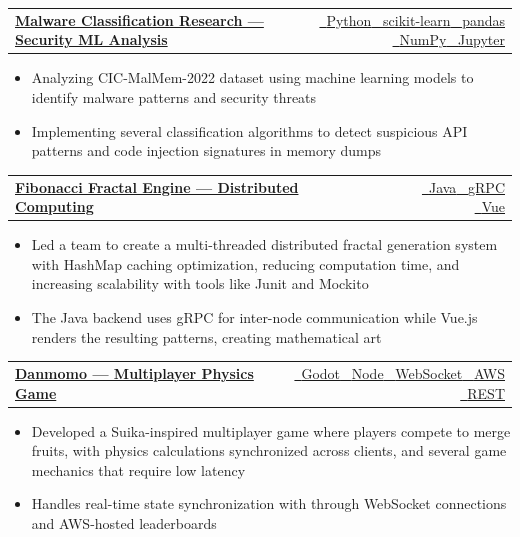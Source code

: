 \documentclass[letterpaper,10pt]{article}
\makeatletter
\newenvironment{ProjectNotes}{%
  \begingroup\fontsize{9.5}{11}\selectfont
  \begin{itemize}[label=--,leftmargin=0.2in,topsep=2pt,itemsep=2pt,parsep=0pt,partopsep=0pt]
}{%
  \end{itemize}\endgroup\vspace{4pt}
}
\newcommand{\TechTag}[1]{{\footnotesize #1}}
\newcommand{\IconTag}[2]{#1\ \TechTag{#2}}
\providecommand{\icJava}{\faIcon{coffee}}
\providecommand{\icPy}{\faIcon{python}}
\providecommand{\icVue}{\faIcon{vuejs}}
\providecommand{\icGodot}{\faIcon{gamepad}}
\providecommand{\icNode}{\faIcon{node-js}}
\providecommand{\icWS}{\faIcon{plug}}
\providecommand{\icGRPC}{\faIcon{exchange-alt}}
\providecommand{\icREST}{\faIcon{cloud}}
\providecommand{\icPandas}{\faIcon{table}}
\providecommand{\icNumpy}{\faIcon{calculator}}
\providecommand{\icSklearn}{\faIcon{brain}}
\providecommand{\icJupyter}{\faIcon{book}}
\providecommand{\icAWS}{\faIcon{aws}}
\newcommand{\ProjectRow}[4]{%
  \vspace{0pt}
  \begin{tabular*}{\textwidth}{@{}l@{\extracolsep{\fill}}r@{}}
    \textbf{\href{#2}{#1}} & {\footnotesize \href{#3}{#4}}
  \end{tabular*}\par
  \vspace{-1pt}
}
\makeatother
\begin{document}
\ProjectRow{Malware Classification Research — Security ML Analysis}
{https://github.com/ndg8743/MalwareClassification}
{github.com/ndg8743/MalwareClassification}
{\IconTag{\icPy}{Python} \IconTag{\icSklearn}{scikit-learn} \IconTag{\icPandas}{pandas} \IconTag{\icNumpy}{NumPy} \IconTag{\icJupyter}{Jupyter}}
\begin{ProjectNotes}
  \item Analyzing CIC-MalMem-2022 dataset using machine learning models to identify malware patterns and security threats
  \item Implementing several classification algorithms to detect suspicious API patterns and code injection signatures in memory dumps
\end{ProjectNotes}

\ProjectRow{Fibonacci Fractal Engine — Distributed Computing}
{https://github.com/ndg8743/Fibonacci-Fractal-Engine}
{github.com/ndg8743/Fibonacci-Fractal-Engine}
{\IconTag{\icJava}{Java} \IconTag{\icGRPC}{gRPC} \IconTag{\icVue}{Vue}}
\begin{ProjectNotes}
    \item Led a team to create a multi-threaded distributed fractal generation system with HashMap caching optimization, reducing computation time, and increasing scalability with tools like Junit and Mockito
  \item The Java backend uses gRPC for inter-node communication while Vue.js renders the resulting patterns, creating mathematical art
\end{ProjectNotes}

\ProjectRow{Danmomo — Multiplayer Physics Game}
{https://github.com/ndg8743/Danmomo}
{github.com/ndg8743/Danmomo}
{\IconTag{\icGodot}{Godot} \IconTag{\icNode}{Node} \IconTag{\icWS}{WebSocket} \IconTag{\icAWS}{AWS} \IconTag{\icREST}{REST}}
\begin{ProjectNotes}
  \item Developed a Suika-inspired multiplayer game where players compete to merge fruits, with physics calculations synchronized across clients, and several game mechanics that require low latency
  \item Handles real-time state synchronization with through WebSocket connections and AWS-hosted leaderboards
\end{ProjectNotes}
\end{document}
